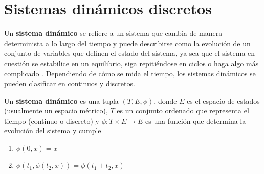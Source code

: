 \documentclass[../Main.tex]{subfiles}
\begin{document}
\section{Sistemas dinámicos discretos}


Un \textbf{sistema dinámico} se refiere a un sistema que cambia de manera determinista a lo largo del tiempo y puede describirse como la evolución de un conjunto de variables que definen el estado del sistema, ya sea que el sistema en cuestión se estabilice en un equilibrio, siga repitiéndose en ciclos o haga algo más complicado \cite{Strogatz2018}. Dependiendo de cómo se mida el tiempo, los sistemas dinámicos se pueden clasificar en continuos y discretos. 

\begin{definition}
\label{def:sd}
    Un \textbf{sistema dinámico} es una tupla $(T,E,\phi)$, donde $E$ es el espacio de estados (usualmente un espacio métrico), $T$ es un conjunto ordenado que representa el tiempo (continuo o discreto) y $\phi:T\times E\rightarrow E$ es una función que determina la evolución del sistema y cumple \begin{enumerate}
        \item $\phi(0,x)=x$
        \item $\phi(t_1,\phi(t_2,x))=\phi(t_1+t_2,x)$
    \end{enumerate} 
\end{definition}
\end{document}

